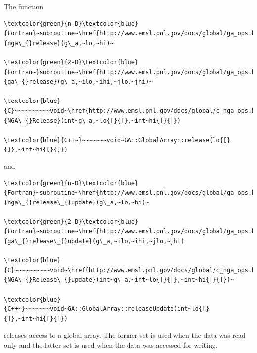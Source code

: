 The function
\begin{verbatim}
\textcolor{green}{n-D}\textcolor{blue}{Fortran}~subroutine~\href{http://www.emsl.pnl.gov/docs/global/ga_ops.html\#ga_release}{nga\_{}release}(g\_a,~lo,~hi)~

\textcolor{green}{2-D}\textcolor{blue}{Fortran~}subroutine~\href{http://www.emsl.pnl.gov/docs/global/ga_ops.html\#ga_release}{ga\_{}release}(g\_a,~ilo,~ihi,~jlo,~jhi)~

\textcolor{blue}{C}~~~~~~~~~~void~\href{http://www.emsl.pnl.gov/docs/global/c_nga_ops.html\#ga_release}{NGA\_{}Release}(int~g\_a,~lo{[}{]},~int~hi{[}{]})

\textcolor{blue}{C++~}~~~~~~~void~GA::GlobalArray::release(lo{[}{]},~int~hi{[}{]})
\end{verbatim}
and
\begin{verbatim}
\textcolor{green}{n-D}\textcolor{blue}{Fortran}~subroutine~\href{http://www.emsl.pnl.gov/docs/global/ga_ops.html\#ga_release_update}{nga\_{}release\_{}update}(g\_a,~lo,~hi)~

\textcolor{green}{2-D}\textcolor{blue}{Fortran}~subroutine~\href{http://www.emsl.pnl.gov/docs/global/ga_ops.html\#ga_release_update}{ga\_{}release\_{}update}(g\_a,~ilo,~ihi,~jlo,~jhi)

\textcolor{blue}{C}~~~~~~~~~~void~\href{http://www.emsl.pnl.gov/docs/global/c_nga_ops.html\#ga_release_update}{NGA\_{}Release\_{}update}(int~g\_a,~int~lo{[}{]},~int~hi{[}{]})~

\textcolor{blue}{C++~}~~~~~~~void~GA::GlobalArray::releaseUpdate(int~lo{[}{]},~int~hi{[}{]})
\end{verbatim}
releases access to a global array. The former set is used when the
data was read only and the latter set is used when the data was accessed
for writing.

